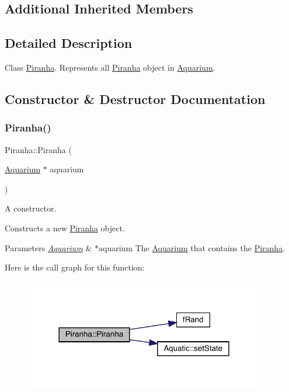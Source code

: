 \subsection*{Additional Inherited Members}


\subsection{Detailed Description}
Class \mbox{\hyperlink{class_piranha}{Piranha}}. Represents all \mbox{\hyperlink{class_piranha}{Piranha}} object in \mbox{\hyperlink{class_aquarium}{Aquarium}}. 

\subsection{Constructor \& Destructor Documentation}
\mbox{\label{class_piranha_a5eb2894a518f67c377b2f51dae114099}} 
\subsubsection{\texorpdfstring{Piranha()}{Piranha()}}
{\footnotesize\ttfamily Piranha\+::\+Piranha (\begin{DoxyParamCaption}\item[{\mbox{\hyperlink{class_aquarium}{Aquarium}} $\ast$}]{aquarium }\end{DoxyParamCaption})}



A constructor. 

Constructs a new \mbox{\hyperlink{class_piranha}{Piranha}} object. 
\begin{DoxyParams}{Parameters}
{\em \mbox{\hyperlink{class_aquarium}{Aquarium}}} & $\ast$aquarium The \mbox{\hyperlink{class_aquarium}{Aquarium}} that contains the \mbox{\hyperlink{class_piranha}{Piranha}}. \\
\hline
\end{DoxyParams}
Here is the call graph for this function\+:\nopagebreak
\begin{figure}[H]
\begin{center}
\leavevmode
\includegraphics[width=298pt]{class_piranha_a5eb2894a518f67c377b2f51dae114099_cgraph}
\end{center}
\end{figure}


